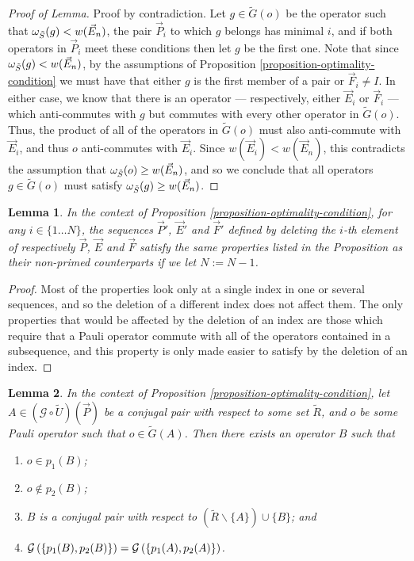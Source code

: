 \documentclass[twocolumn,showpacs,preprintnumbers,amsmath,amssymb,nofootinbib,pra,floatfix]{revtex4-1}
\newtheorem{lemma}{Lemma}
\newcommand{\lst}{\vec}
\newcommand{\set}{\tilde}
\newcommand{\genfun}{\mathcal{G}}
\begin{document}
\begin{proof}[Proof of Lemma]
Proof by contradiction.  Let $g\in \set G(o)$ be the operator such that $\om_{\set S}(g)<w(\lst E_n)$, the pair $\lst P_i$ to which $g$ belongs has minimal $i$, and if both operators in $\lst P_i$ meet these conditions then let $g$ be the first one.  Note that since $\om_{\set S}(g)<w(\lst E_n)$, by the assumptions of Proposition \ref{proposition-optimality-condition} we must have that either $g$ is the first member of a pair or $\lst F_i\ne I$.  In either case, we know that there is an operator --- respectively, either $\lst E_i$ or $\lst F_i$ --- which anti-commutes with $g$ but commutes with every other operator in $\set G(o)$.  Thus, the product of all of the operators in $\set G(o)$ must also anti-commute with $\lst E_i$, and thus $o$ anti-commutes with $\lst E_i$.  Since $w(\lst E_i)<w(\lst E_n)$, this contradicts the assumption that $\om_{\set S}(o)\ge w(\lst E_n)$, and so we conclude that all operators $g\in\set G(o)$ must satisfy $\om_{\set S}(g)\ge w(\lst E_n)$.
\end{proof}
\begin{lemma}
In the context of Proposition \ref{proposition-optimality-condition}, for any $i\in\{1\dots N\}$, the sequences $\lst P'$, $\lst E'$ and $\lst F'$ defined by deleting the $i$-th element of respectively $\lst P$, $\lst E$ and $\lst F$ satisfy the same properties listed in the Proposition as their non-primed counterparts if we let $N:=N-1$.
\end{lemma}

\begin{proof}
Most of the properties look only at a single index in one or several sequences, and so the deletion of a different index does not affect them.  The only properties that would be affected by the deletion of an index are those which require that a Pauli operator commute with all of the operators contained in a subsequence, and this property is only made easier to satisfy by the deletion of an index.
\end{proof}
\begin{lemma}
\label{single-pair-rearrangement}
In the context of Proposition \ref{proposition-optimality-condition}, let $A\in(\genfun\circ\set U)(\lst P)$ be a conjugal pair with respect to some set $\set R$, and $o$ be some Pauli operator such that $o\in\set G(A)$.  Then there exists an operator $B$ such that
\begin{enumerate}
\item $o\in p_1(B)$;
\item $o\notin p_2(B)$;
\item $B$ is a conjugal pair with respect to $(\set R\backslash \{A\})\cup\{B\}$; and
\item $\genfun\paren{\{p_1(B),p_2(B)\}} = \genfun\paren{\{p_1(A),p_2(A)\}}$.
\end{enumerate}
\end{lemma}
\end{document}
